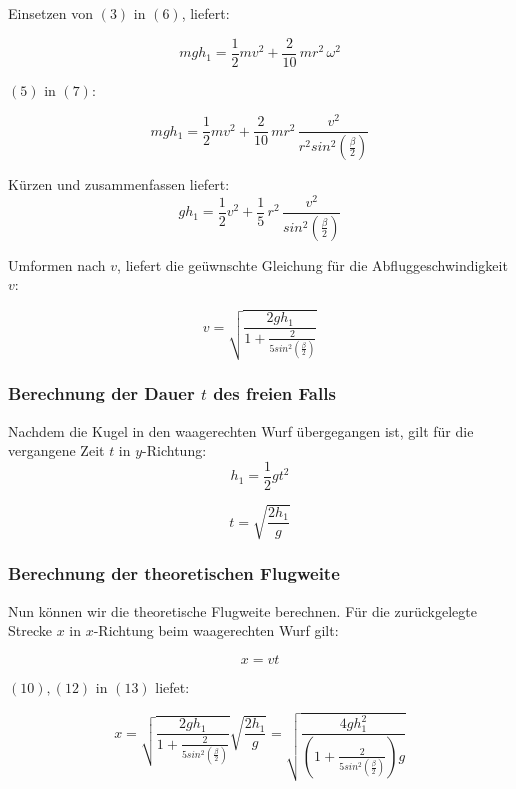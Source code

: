 \documentclass{article}
\begin{document}
Einsetzen von $(3)$ in $(6)$, liefert:

\begin{equation}
mgh_{1} = \frac{1}{2}mv^{2} + \frac{2}{10}\,mr^{2}\, \omega^{2}
\end{equation}

$(5)$ in $(7)$:

\begin{equation}
mgh_{1} = \frac{1}{2}mv^{2} + \frac{2}{10}\,mr^{2}\, \frac{v^{2}}{r^{2} sin^{2}(\frac{\beta}{2})}
\end{equation}

Kürzen und zusammenfassen liefert:
\begin{equation}
gh_{1} = \frac{1}{2}v^{2} + \frac{1}{5}\,r^{2}\, \frac{v^{2}}{sin^{2}(\frac{\beta}{2})}
\end{equation}

Umformen nach $v$, liefert die geüwnschte Gleichung für die Abfluggeschwindigkeit $v$:

\begin{equation}
v = \sqrt{\frac{2gh_{1}}{1+\frac{2}{5sin^{2}(\frac{\beta}{2})}}}
\end{equation}

\subsubsection{Berechnung der Dauer $t$ des freien Falls}
Nachdem die Kugel in den waagerechten Wurf übergegangen ist, gilt für die vergangene Zeit $t$ in $y$-Richtung:
\begin{equation}
h_{1} = \frac{1}{2}gt^{2}
\end{equation}

\begin{equation}
t = \sqrt{\frac{2h_{1}}{g}}
\end{equation}


\subsubsection{Berechnung der theoretischen Flugweite}
Nun können wir die theoretische Flugweite berechnen. 
Für die zurückgelegte Strecke $x$ in $x$-Richtung beim waagerechten Wurf gilt:

\begin{equation}
x = vt
\end{equation}

$(10), (12)$ in $(13)$ liefet:

\begin{equation}
x = \sqrt{\frac{2gh_{1}}{1+\frac{2}{5sin^{2}(\frac{\beta}{2})}}}\sqrt{\frac{2h_{1}}{g}} = \sqrt{\frac{4gh_{1}^{2}}{(1+\frac{2}{5sin^{2}(\frac{\beta}{2})})g}}
\end{equation}
\end{document}
